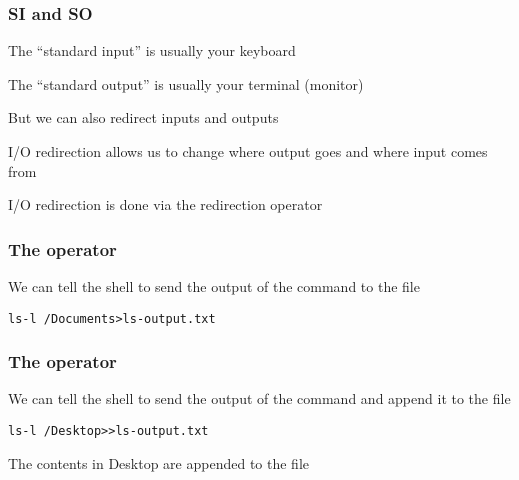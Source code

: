 \documentclass[12pt]{beamer}\usepackage[]{graphicx}\usepackage[]{color}
\makeatletter
\newenvironment{kframe}{%
 \def\at@end@of@kframe{}%
 \ifinner\ifhmode%
  \def\at@end@of@kframe{\end{minipage}}%
  \begin{minipage}{\columnwidth}%
 \fi\fi%
 \def\FrameCommand##1{\hskip\@totalleftmargin \hskip-\fboxsep
 \colorbox{shadecolor}{##1}\hskip-\fboxsep
     \hskip-\linewidth \hskip-\@totalleftmargin \hskip\columnwidth}%
 \MakeFramed {\advance\hsize-\width
   \@totalleftmargin\z@ \linewidth\hsize
   \@setminipage}}%
 {\par\unskip\endMakeFramed%
 \at@end@of@kframe}
\newenvironment{knitrout}{}{} %
\makeatother
\begin{document}

\begin{frame}
\frametitle{SI and SO}

\bbi
  \item The ``standard input'' is usually your keyboard
  \item The ``standard output'' is usually your terminal (monitor)
  \item But we can also redirect inputs and outputs
  \item I/O redirection allows us to change where output goes and where input comes from
  \item I/O redirection is done via the {\hilit \code{>}} redirection operator
\ei

\end{frame}


\begin{frame}
\begin{center}
\Huge{}
\end{center}
\end{frame}


\begin{frame}[fragile]
\frametitle{The \code{>} operator}

We can tell the shell to send the output of the  command to the file 
\begin{knitrout}\footnotesize
{}\color{fgcolor}\begin{kframe}
\begin{alltt}
ls -l ~/Documents > ls-output.txt
\end{alltt}
\end{kframe}
\end{knitrout}

\end{frame}


\begin{frame}[fragile]
\frametitle{The \code{>>} operator}

We can tell the shell to send the output of the  command and append it to the file 
\begin{knitrout}\footnotesize
{}\color{fgcolor}\begin{kframe}
\begin{alltt}
ls -l ~/Desktop >> ls-output.txt
\end{alltt}
\end{kframe}
\end{knitrout}

The contents in Desktop are appended to the file 

\end{frame}
\end{document}
